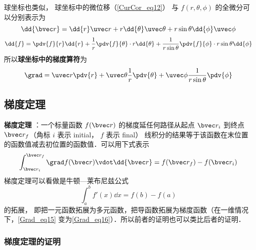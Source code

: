 球坐标也类似， 球坐标中的微位移（\autoref{CurCor_eq12}） 与 $f(r,\theta,\phi)$ 的全微分可以分别表示为
\begin{equation}
\dd{\bvec r} = \dd{r}\uvec r + r\dd{\theta} \uvec \theta + r\sin\theta\dd{\phi}\uvec \phi
\end{equation}
\begin{equation}
\dd{f} = \pdv{f}{r} \dd{r} + \frac1r \pdv{f}{\theta} \cdot r\dd{\theta} + \frac{1}{ r\sin\theta} \pdv{f}{\phi} \cdot r\sin\theta\dd{\phi}
\end{equation}
所以\textbf{球坐标中的梯度算符}为
\begin{equation}
\grad = \uvec r \pdv{r} + \uvec \theta \frac1r \pdv{\theta} + \uvec \phi \frac{1}{ r\sin\theta} \pdv{\phi}
\end{equation}

\subsection{梯度定理}

\textbf{梯度定理} ：一个标量函数 $f(\bvec r)$ 的梯度延任何路径从起点 $\bvec r_i$ 到终点 $\bvec r_f$（角标 $i$ 表示 initial， $f$ 表示 final）  线积分的结果等于该函数在末位置的函数值减去初位置的函数值．可以用下式表示
\begin{equation}\label{Grad_eq15}
\int_{\bvec r_i}^{\bvec r_f} \grad f(\bvec r) \vdot \dd{\bvec r} = f(\bvec r_f) - f(\bvec r_i)
\end{equation}
梯度定理可以看做是牛顿—莱布尼兹公式
\begin{equation}\label{Grad_eq16}
\int_a^b f'(x) \dd{x}  = f(b) - f(a)
\end{equation}
的拓展， 即把一元函数拓展为多元函数，把导函数拓展为梯度函数（在一维情况下，\autoref{Grad_eq15} 变为\autoref{Grad_eq16}）．所以前者的证明也可以类比后者的证明．

\subsubsection{梯度定理的证明}


